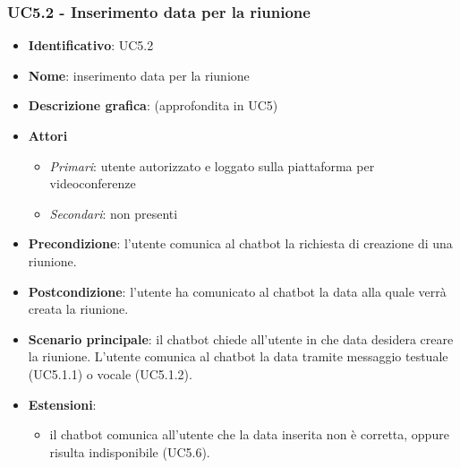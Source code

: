 \subsubsection{UC5.2 - Inserimento data per la riunione}
\begin{itemize}
    \item \textbf{Identificativo}: UC5.2
    \item \textbf{Nome}: inserimento data per la riunione
    \item \textbf{Descrizione grafica}: (approfondita in UC5)
    \item \textbf{Attori}
 \begin{itemize} 
    \item \textit{Primari}: utente autorizzato e loggato sulla piattaforma per videoconferenze
    \item \textit{Secondari}: non presenti
 \end{itemize}
 \item \textbf{Precondizione}: l'utente comunica al chatbot la richiesta di creazione di una riunione.
 \item \textbf{Postcondizione}: l'utente ha comunicato al chatbot la data alla quale verrà creata la riunione.
 \item \textbf{Scenario principale}: il chatbot chiede all'utente in che data desidera creare la riunione. L'utente comunica al chatbot la data tramite messaggio testuale (UC5.1.1) o vocale (UC5.1.2).
 \item \textbf{Estensioni}: 
 \begin{itemize} 
    \item il chatbot comunica all'utente che la data inserita non è corretta, oppure risulta indisponibile (UC5.6).
 \end{itemize}
\end{itemize}

